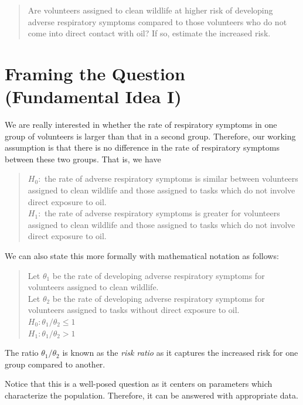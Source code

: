 \documentclass[]{book}
\theoremstyle{definition}
\theoremstyle{definition}
\theoremstyle{definition}
\theoremstyle{remark}
\begin{document}
\begin{quote}
Are volunteers assigned to clean wildlife at higher risk of developing
adverse respiratory symptoms compared to those volunteers who do not
come into direct contact with oil? If so, estimate the increased risk.
\end{quote}

\section{Framing the Question (Fundamental Idea
I)}\label{framing-the-question-fundamental-idea-i}

We are really interested in whether the rate of respiratory symptoms in
one group of volunteers is larger than that in a second group.
Therefore, our working assumption is that there is no difference in the
rate of respiratory symptoms between these two groups. That is, we have

\begin{quote}
\(H_0:\) the rate of adverse respiratory symptoms is similar between
volunteers assigned to clean wildlife and those assigned to tasks which
do not involve direct exposure to oil.\\
\(H_1:\) the rate of adverse respiratory symptoms is greater for
volunteers assigned to clean wildlife and those assigned to tasks which
do not involve direct exposure to oil.
\end{quote}

We can also state this more formally with mathematical notation as
follows:

\begin{quote}
Let \(\theta_1\) be the rate of developing adverse respiratory symptoms
for volunteers assigned to clean wildlife.\\
Let \(\theta_2\) be the rate of developing adverse respiratory symptoms
for volunteers assigned to tasks without direct exposure to oil.\\
\(H_0: \theta_1/\theta_2 \leq 1\)\\
\(H_1: \theta_1/\theta_2 > 1\)
\end{quote}

The ratio \(\theta_1/\theta_2\) is known as the \emph{risk ratio} as it
captures the increased risk for one group compared to another.

Notice that this is a well-posed question as it centers on parameters
which characterize the population. Therefore, it can be answered with
appropriate data.
\end{document}
